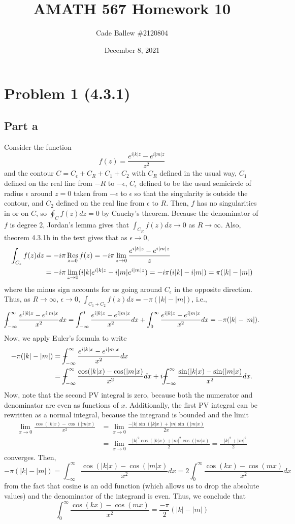 \documentclass{article}
\title{AMATH 567 Homework 10}
\author{Cade Ballew \#2120804}
\date{December 8, 2021}
\begin{document}
\maketitle

\section{Problem 1 (4.3.1)}
\subsection{Part a}
Consider the function 
\[
f(z)=\frac{e^{i|k|z}-e^{i|m|z}}{z^2}
\]
and the contour $C=C_\epsilon+C_R+C_1+C_2$ with $C_R$ defined in the usual way, $C_1$ defined on the real line from $-R$ to $-\epsilon$, $C_\epsilon$ defined to be the usual semicircle of radius $\epsilon$ around $z=0$ taken from $-\epsilon$ to $\epsilon$ so that the singularity is outside the contour, and $C_2$ defined on the real line from $\epsilon$ to $R$. Then, $f$ has no singularities in or on $C$, so $\oint_Cf(z)dz=0$ by Cauchy's theorem. Because the denominator of $f$ is degree 2, Jordan's lemma gives that $\int_{C_R}f(z)dz\to0$ as $R\to\infty$. Also, theorem 4.3.1b in the text gives that as $\epsilon\to0$,
\begin{align*}
\int_{C_\epsilon}f(z)dz&=-i\pi\operatorname*{Res}_{z=0}f(z)=-i\pi\lim_{z\to0}\frac{e^{i|k|z}-e^{i|m|z}}{z}\\&=-i\pi\lim_{z\to0}(i|k|e^{i|k|z}-i|m|e^{i|m|z})=-i\pi(i|k|-i|m|)=\pi(|k|-|m|)
\end{align*}
where the minus sign accounts for us going around $C_\epsilon$ in the opposite direction. Thus, as $R\to\infty$, $\epsilon\to0$, $\int_{C_1+C_2}f(z)dz=-\pi(|k|-|m|)$, i.e.,
\[
\pvint_{-\infty}^\infty\frac{e^{i|k|x}-e^{i|m|x}}{x^2}dx=\int_{-\infty}^0\frac{e^{i|k|x}-e^{i|m|x}}{x^2}dx+\int_0^\infty\frac{e^{i|k|x}-e^{i|m|x}}{x^2}dx=-\pi(|k|-|m|).
\]
Now, we apply Euler's formula to write
\begin{align*}
-\pi(|k|-|m|)&=\pvint_{-\infty}^\infty\frac{e^{i|k|x}-e^{i|m|x}}{x^2}dx\\&=
\pvint_{-\infty}^\infty\frac{\cos(|k|x)-\cos(|m|x)}{x^2}dx+i\pvint_{-\infty}^\infty\frac{\sin(|k|x)-\sin(|m|x)}{x^2}dx.
\end{align*}
Now, note that the second PV integral is zero, because both the numerator and denominator are even as functions of $x$. Additionally, the first PV integral can be rewritten as a normal integral, because the integrand is bounded and  the limit
\begin{align*}
\lim_{x\to0}\frac{\cos(|k|x)-\cos(|m|x)}{x^2}&=\lim_{x\to0}\frac{-|k|\sin(|k|x)+|m|\sin(|m|x)}{2x}\\&=\lim_{x\to0}\frac{-|k|^2\cos(|k|x)+|m|^2\cos(|m|x)}{2}=\frac{-|k|^2+|m|^2}{2}
\end{align*}
converges. Then, 
\[
-\pi(|k|-|m|)=\int_{-\infty}^\infty\frac{\cos(|k|x)-\cos(|m|x)}{x^2}dx=2\int_0^\infty\frac{\cos(kx)-\cos(mx)}{x^2}dx
\]
from the fact that cosine is an odd function (which allows us to drop the absolute values) and the denominator of the integrand is even. Thus, we conclude that 
\[
\int_0^\infty\frac{\cos(kx)-\cos(mx)}{x^2}=\frac{-\pi}{2}(|k|-|m|)
\]
\end{document}

